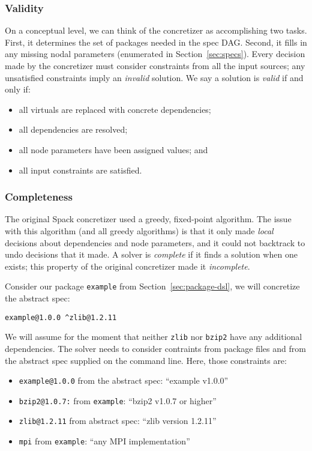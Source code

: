 \subsubsection{Validity}

On a conceptual level, we can think of the concretizer as accomplishing two tasks.
First, it determines the set of packages needed in the spec DAG. Second, it fills in any
missing nodal parameters (enumerated in Section~\ref{sec:specs}). Every decision made by
the concretizer must consider constraints from all the input sources; any unsatisfied
constraints imply an {\it invalid} solution. We say a solution is {\it valid} if and only if:
\begin{itemize}
\item all virtuals are replaced with concrete dependencies;
\item all dependencies are resolved;
\item all node parameters have been assigned values; and
\item all input constraints are satisfied.
\end{itemize}

\subsubsection{Completeness}
The original Spack concretizer used a greedy, fixed-point algorithm. The issue with this
algorithm (and all greedy algorithms) is that it only made {\it local} decisions about
dependencies and node parameters, and it could not backtrack to undo decisions that it
made. A solver is {\it complete} if it finds a solution when one exists; this property
of the original concretizer made it {\it incomplete}.

Consider our package \texttt{example} from Section~\ref{sec:package-dsl}, we will
concretize the abstract spec:
\begin{verbatim}
example@1.0.0 ^zlib@1.2.11
\end{verbatim}
We will assume for the moment that neither \texttt{zlib} nor \texttt{bzip2} have any
additional dependencies. The solver needs to consider contraints from package files
and from the abstract spec supplied on the command line. Here, those constraints are:

\begin{itemize}
\item {\tt example@1.0.0} from the abstract spec: ``example v1.0.0''
\item {\tt bzip2@1.0.7:} from {\tt example}: ``bzip2 v1.0.7 or higher''
\item {\tt zlib@1.2.11} from abstract spec: ``zlib version 1.2.11''
\item {\tt mpi} from {\tt example}: ``any MPI implementation''
\end{itemize}

